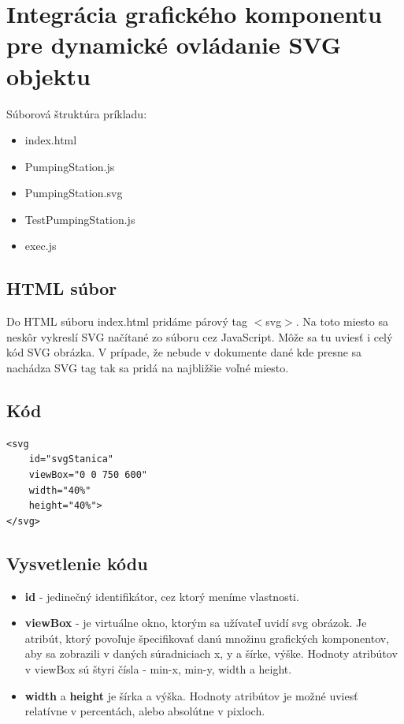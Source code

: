 \section{Integrácia grafického komponentu pre dynamické ovládanie SVG objektu}

Súborová štruktúra príkladu: 
\begin{itemize}
	\item index.html 
	\item PumpingStation.js
	\item PumpingStation.svg
	\item TestPumpingStation.js
	\item exec.js 
\end{itemize}

\subsection{HTML súbor}
Do HTML súboru index.html pridáme párový tag $<$svg$>$. Na toto miesto sa neskôr vykreslí SVG načítané zo súboru cez JavaScript. Môže sa tu uviesť i celý kód SVG obrázka. V prípade, že nebude v dokumente dané kde presne sa nachádza SVG tag tak sa pridá na najbližšie voľné miesto. 
\subsection{Kód}
\begin{lstlisting}
<svg 
	id="svgStanica" 
	viewBox="0 0 750 600" 
	width="40%" 
	height="40%"> 
</svg>
\end{lstlisting}

\subsection{Vysvetlenie kódu}
\begin{itemize}
\item  \textbf{id} - jedinečný identifikátor, cez ktorý meníme vlastnosti.
\item 	\textbf{viewBox} - je virtuálne okno, ktorým sa užívateľ uvidí svg obrázok. Je atribút, ktorý povoľuje špecifikovať danú množinu grafických komponentov, aby sa zobrazili v daných súradniciach x, y a šírke, výške. Hodnoty atribútov v viewBox sú štyri čísla - min-x, min-y, width a height. 
\item 	\textbf{width} a \textbf{height} je šírka a výška. Hodnoty atribútov je možné uviesť relatívne v percentách, alebo absolútne v pixloch. 
\end{itemize}

